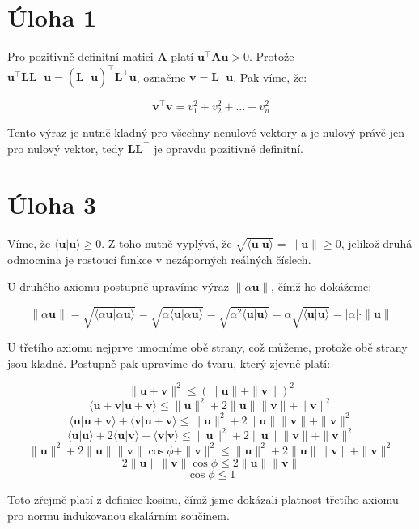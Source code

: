 \documentclass{fkssolpub}
\author{Ondřej Sedláček}
\begin{document}
\section{Úloha 1}

Pro pozitivně definitní matici $\mathbf{A}$ platí $\mathbf{u}^{\top} \mathbf{A u} > 0$. Protože $\mathbf{u}^{\top} \mathbf{L L}^{\top} \mathbf{u} = (\mathbf{L}^{\top} \mathbf{u})^{\top} \mathbf{L}^{\top} \mathbf{u}$, označme $\mathbf{v} = \mathbf{L}^{\top} \mathbf{u}$. Pak víme, že:

\[
  \mathbf{v}^{\top} \mathbf{v} = v_1^2 + v_2^2 + \dots + v_n^2
\]

Tento výraz je nutně kladný pro všechny nenulové vektory a je nulový právě jen pro nulový vektor, tedy $\mathbf{L L}^{\top}$ je opravdu pozitivně definitní.


\section{Úloha 3}

Víme, že $\langle \mathbf{u} \vert \mathbf{u} \rangle \geq 0$. Z toho nutně vyplývá, že $\sqrt{\langle \mathbf{u} \vert \mathbf{u} \rangle} = \| \mathbf{u} \| \geq 0$, jelikož druhá odmocnina je rostoucí funkce v nezáporných reálných číslech.

U druhého axiomu postupně upravíme výraz $\| \alpha \mathbf{u} \|$, čímž ho dokážeme:

\[
  \| \alpha \mathbf{u} \| = \sqrt{\langle \alpha \mathbf{u} \vert \alpha \mathbf{u} \rangle} = \sqrt{\alpha \langle \mathbf{u} \vert \alpha \mathbf{u} \rangle} =  \sqrt{\alpha^2 \langle \mathbf{u} \vert  \mathbf{u} \rangle} = \alpha \sqrt{\langle \mathbf{u} \vert  \mathbf{u} \rangle} = |\alpha| \cdot \| \mathbf{u} \|
\]

U třetího axiomu nejprve umocníme obě strany, což můžeme, protože obě strany jsou kladné. Postupně pak upravíme do tvaru, který zjevně platí:

\[
  \| \mathbf{u} + \mathbf{v} \|^2 \leq (\| \mathbf{u} \| + \| \mathbf{v} \|)^2
\]
\[
  \langle \mathbf{u} + \mathbf{v} \vert \mathbf{u} + \mathbf{v} \rangle \leq \| \mathbf{u} \|^2 + 2 \| \mathbf{u} \| \| \mathbf{v} \| + \| \mathbf{v} \|^2
\]
\[
  \langle \mathbf{u} \vert \mathbf{u} + \mathbf{v} \rangle + \langle \mathbf{v} \vert \mathbf{u} + \mathbf{v} \rangle \leq  \| \mathbf{u} \|^2 + 2 \| \mathbf{u} \| \| \mathbf{v} \| + \| \mathbf{v} \|^2 
\]
\[
  \langle \mathbf{u} \vert \mathbf{u} \rangle + 2 \langle \mathbf{u} \vert \mathbf{v} \rangle + \langle \mathbf{v} \vert \mathbf{v} \rangle \leq  \| \mathbf{u} \|^2 + 2 \| \mathbf{u} \| \| \mathbf{v} \| + \| \mathbf{v} \|^2 
\]
\[
   \| \mathbf{u} \|^2 + 2 \| \mathbf{u} \| \| \mathbf{v} \| \cos \phi +\| \mathbf{v} \|^2 \leq  \| \mathbf{u} \|^2 + 2 \| \mathbf{u} \| \| \mathbf{v} \| + \| \mathbf{v} \|^2 
\]
\[
   2 \| \mathbf{u} \| \| \mathbf{v} \| \cos \phi \leq 2 \| \mathbf{u} \| \| \mathbf{v} \| 
\]
\[
   \cos \phi \leq 1 
\]

Toto zřejmě platí z definice kosinu, čímž jsme dokázali platnost třetího axiomu pro normu indukovanou skalárním součinem.
\end{document}

